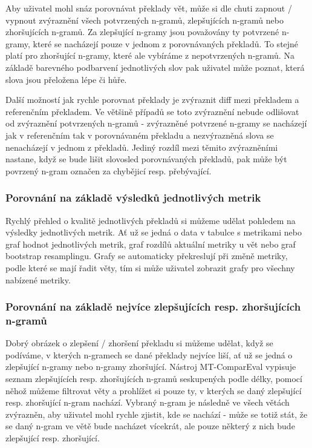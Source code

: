 Aby uživatel mohl snáz porovnávat překlady vět,
  může si dle chuti zapnout / vypnout zvýraznění všech potvrzených \mbox{n-gramů},
  zlepšujících \mbox{n-gramů} nebo zhoršujících \mbox{n-gramů}.
Za zlepšující \mbox{n-gramy} jsou považovány ty potvrzené \mbox{n-gramy},
  které se nacházejí pouze v jednom z porovnávaných překladů.
To stejné platí pro zhoršující \mbox{n-gramy},
  které ale vybíráme z nepotvrzených \mbox{n-gramů}.
Na základě barevného podbarvení jednotlivých slov pak uživatel může poznat,
  která slova jsou přeložena lépe či hůře.

Další možností jak rychle porovnat překlady je zvýraznit diff mezi překladem a referenčním překladem.
Ve většině případů se toto zvýraznění nebude odlišovat od zvýraznění potvrzených \mbox{n-gramů} -
  zvýrazněné potvrzené \mbox{n-gramy} se nacházejí jak v referenčním tak v porovnávaném překladu
  a nezvýrazněná slova se nenacházejí v jednom z překladů.
Jediný rozdíl mezi těmito zvýrazněními nastane,
  když se bude lišit slovosled porovnávaných překladů,
  pak může být povrzený \mbox{n-gram} označen za chybějicí resp. přebývající.

\subsubsection{Porovnání na základě výsledků jednotlivých metrik}
Rychlý přehled o kvalitě jednotlivých překladů si můžeme udělat pohledem na výsledky jednotlivých metrik.
Ať už se jedná o data v tabulce s metrikami nebo graf hodnot jednotlivých metrik,
  graf rozdílů aktuální metriky u vět nebo graf bootstrap resamplingu.
Grafy se automaticky překreslují při změně metriky,
  podle které se mají řadit věty,
  tím si může uživatel zobrazit grafy pro všechny nabízené metriky.


\subsubsection{Porovnání na základě nejvíce zlepšujících resp. zhoršujících \mbox{n-gramů}}
Dobrý obrázek o zlepšení / zhoršení překladu si můžeme udělat,
  když se podíváme,
  v kterých \mbox{n-gramech} se dané překlady nejvíce liší,
  ať už se jedná o zlepšující \mbox{n-gramy} nebo \mbox{n-gramy} zhoršující.
Nástroj MT-ComparEval vypisuje seznam zlepšujících resp. zhoršujících \mbox{n-gramů} seskupených podle délky,
  pomocí něhož můžeme filtrovat věty a prohlížet si pouze ty,
  v kterých se daný zlepšující resp. zhoršující \mbox{n-gram} nachází.
Vybraný \mbox{n-gram} je následně ve všech větách zvýrazněn,
  aby uživatel mohl rychle zjistit, kde se nachází -
  může se totiž stát, že se daný \mbox{n-gram} ve větě bude nacházet vícekrát,
  ale pouze některý z nich bude zlepšující resp. zhoršující.

